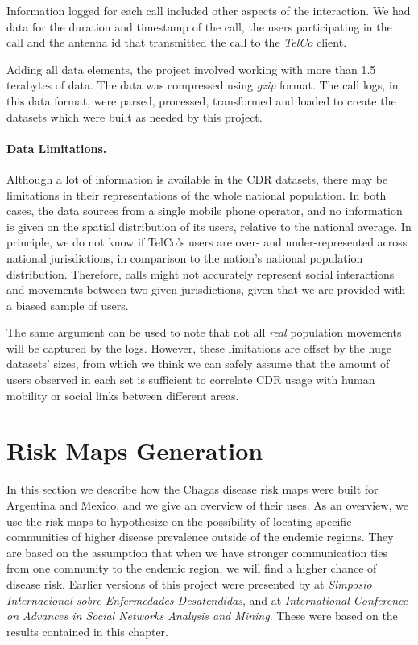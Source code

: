 Information logged for each call included other aspects of the interaction.
We had data for the duration and timestamp of the call, the users participating in the call and the antenna id that transmitted the call to the \emph{TelCo} client.

Adding all data elements, the project involved working with more than 1.5 terabytes of data.
The data was compressed using \emph{gzip} format.
The call logs, in this data format, were parsed, processed, transformed and loaded to create the datasets which were built as needed by this project.

\paragraph{Data Limitations.}
Although a lot of information is available in the CDR datasets, there may be limitations in their representations of the whole national population.
In both cases, the data sources from a single mobile phone operator, and no information is given on the spatial distribution of its users, relative to the national average.
In principle, we do not know if TelCo's users are over- and under-represented across national jurisdictions, in comparison to the nation's national population distribution.
Therefore, calls might not accurately represent social interactions and movements between two given jurisdictions, given that we are provided with a biased sample of users.

The same argument can be used to note that not all \textit{real} population movements will be captured by the logs.
However, these limitations are offset by the huge datasets' sizes, from which we think we can safely assume that the amount of users observed in each set is sufficient to correlate CDR usage with human mobility or social links between different areas.

\section{ Risk Maps Generation}\label{section:risk_maps}

In this section we describe how the Chagas disease risk maps were built for Argentina and Mexico, and we give an overview of their uses.
As an overview, we use the risk maps to hypothesize on the possibility of locating specific communities of higher disease prevalence outside of the endemic regions.
They are based on the assumption that when we have stronger communication ties from one community to the endemic region, we will find a higher chance of disease risk.
Earlier versions of this project were presented by \citep{sarraute2015descubriendo} at \emph{Simposio Internacional sobre Enfermedades Desatendidas}, and\citep{deMonasterio2016analyzing} at \emph{International Conference on Advances in Social Networks Analysis and Mining}.
These were based on the results contained in this chapter.

